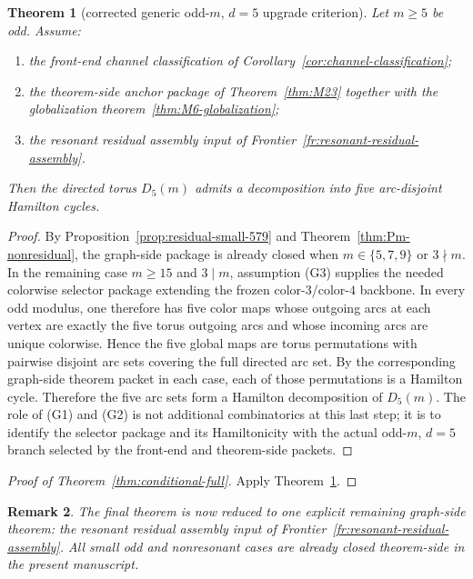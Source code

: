 \documentclass[11pt]{article}
\newtheorem{theorem}{Theorem}[section]
\newtheorem{remark}[theorem]{Remark}
\begin{document}
\begin{theorem}[corrected generic odd-$m$, $d=5$ upgrade criterion]
\label{thm:generic-upgrade}
Let $m\ge 5$ be odd.
Assume:
\begin{enumerate}[label=\textup{(G\arabic*)},leftmargin=3.0em]
\item the front-end channel classification of
      Corollary~\ref{cor:channel-classification};
\item the theorem-side anchor package of Theorem~\ref{thm:M23} together with
      the globalization theorem~\ref{thm:M6-globalization};
\item the resonant residual assembly input of
      Frontier~\ref{fr:resonant-residual-assembly}.
\end{enumerate}
Then the directed torus $D_5(m)$ admits a decomposition into five arc-disjoint
Hamilton cycles.
\end{theorem}

\begin{proof}
By Proposition~\ref{prop:residual-small-579} and
Theorem~\ref{thm:Pm-nonresidual}, the graph-side package is already closed when
$m\in\{5,7,9\}$ or $3\nmid m$.
In the remaining case $m\ge 15$ and $3\mid m$, assumption (G3) supplies the
needed colorwise selector package extending the frozen color-$3$/color-$4$
backbone.
In every odd modulus, one therefore has five color maps whose outgoing arcs at
each vertex are exactly the five torus outgoing arcs and whose incoming arcs
are unique colorwise.
Hence the five global maps are torus permutations with pairwise disjoint arc
sets covering the full directed arc set.
By the corresponding graph-side theorem packet in each case, each of those
permutations is a Hamilton cycle.
Therefore the five arc sets form a Hamilton decomposition of $D_5(m)$.
The role of (G1) and (G2) is not additional combinatorics at this last step;
it is to identify the selector package and its Hamiltonicity with the actual
odd-$m$, $d=5$ branch selected by the front-end and theorem-side packets.
\end{proof}

\begin{proof}[Proof of Theorem~\ref{thm:conditional-full}]
Apply Theorem~\ref{thm:generic-upgrade}.
\end{proof}

\begin{remark}
The final theorem is now reduced to one explicit remaining graph-side theorem:
the resonant residual assembly input of
Frontier~\ref{fr:resonant-residual-assembly}.
All small odd and nonresonant cases are already closed theorem-side in the
present manuscript.
\end{remark}
\end{document}
